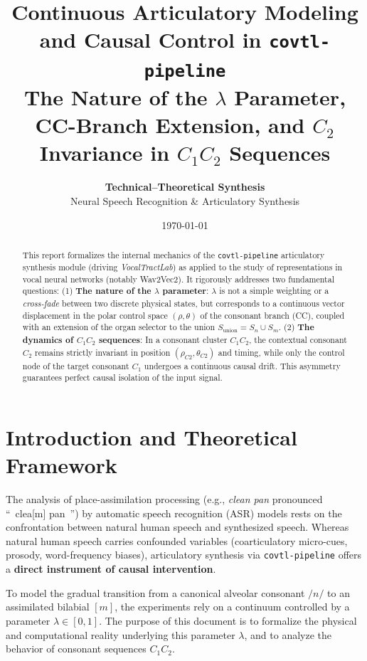 \documentclass[11pt,a4paper]{article}
\title{\vspace{-1cm}
\Huge \textbf{\textcolor{primary}{Continuous Articulatory Modeling and Causal Control in \texttt{covtl-pipeline}}}\\
\Large \vspace{0.3cm} \textcolor{secondary}{The Nature of the $\lambda$ Parameter, CC-Branch Extension, and $C_2$ Invariance in $C_1 C_2$ Sequences}
}
\author{\textbf{Technical--Theoretical Synthesis} \\ Neural Speech Recognition \& Articulatory Synthesis}
\date{\today}
\begin{document}
\maketitle

\begin{abstract}
\noindent This report formalizes the internal mechanics of the \texttt{covtl-pipeline} articulatory synthesis module (driving \textit{VocalTractLab}) as applied to the study of representations in vocal neural networks (notably Wav2Vec2). It rigorously addresses two fundamental questions:
(1) \textbf{The nature of the $\lambda$ parameter}: $\lambda$ is not a simple weighting or a \textit{cross-fade} between two discrete physical states, but corresponds to a continuous vector displacement in the polar control space $(\rho, \theta)$ of the consonant branch (CC), coupled with an extension of the organ selector to the union $S_{\text{union}} = S_n \cup S_m$.
(2) \textbf{The dynamics of $C_1 C_2$ sequences}: In a consonant cluster $C_1 C_2$, the contextual consonant $C_2$ remains strictly invariant in position $(\rho_{C2}, \theta_{C2})$ and timing, while only the control node of the target consonant $C_1$ undergoes a continuous causal drift. This asymmetry guarantees perfect causal isolation of the input signal.
\end{abstract}

\vspace{0.3cm}

\section{Introduction and Theoretical Framework}

The analysis of place-assimilation processing (e.g., \textit{clean pan} pronounced ``~clea[m] pan~'') by automatic speech recognition (ASR) models rests on the confrontation between natural human speech and synthesized speech. Whereas natural human speech carries confounded variables (coarticulatory micro-cues, prosody, word-frequency biases), articulatory synthesis via \texttt{covtl-pipeline} offers a \textbf{direct instrument of causal intervention}.

To model the gradual transition from a canonical alveolar consonant $/n/$ to an assimilated bilabial $[m]$, the experiments rely on a continuum controlled by a parameter $\lambda \in [0, 1]$. The purpose of this document is to formalize the physical and computational reality underlying this parameter $\lambda$, and to analyze the behavior of consonant sequences $C_1 C_2$.
\end{document}
